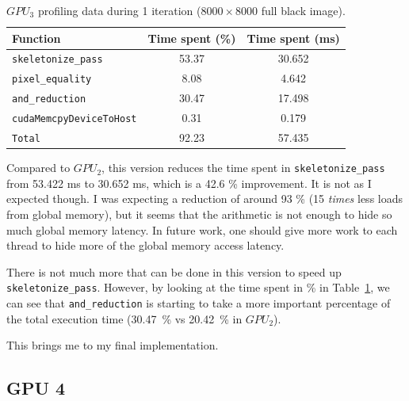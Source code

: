 \documentclass[11pt,a4paper]{article}
\begin{document}
                \begin{table}[ht]
                    \centering
                    \begin{tabular}{lcc}
                        \toprule
                        Function                      & Time spent (\%) & Time spent (ms) \\
                        \midrule
                        \verb+skeletonize_pass+       & 53.37           & 30.652          \\
                        \verb+pixel_equality+         & 8.08            & 4.642           \\
                        \verb+and_reduction+          & 30.47           & 17.498          \\
                        \verb+cudaMemcpyDeviceToHost+ & 0.31            & 0.179           \\
                        \midrule
                        \verb+Total+                  & 92.23           & 57.435          \\
                        \bottomrule
                    \end{tabular}
                    \caption{$GPU_{3}$ profiling data during 1 iteration ($8000 \times 8000$ full black image).}
                    \label{tab:black_gpu3_timing_diagram}
                \end{table}

                Compared to $GPU_{2}$, this version reduces the time spent in \verb+skeletonize_pass+ from 53.422 ms to 30.652 ms, which is a 42.6 \% improvement.
                It is not as I expected though. I was expecting a reduction of around 93 \% (15 \emph{times} less loads from global memory), but it seems that the arithmetic is not enough to hide so much global memory latency.
                In future work, one should give more work to each thread to hide more of the global memory access latency.

                There is not much more that can be done in this version to speed up \verb+skeletonize_pass+. However, by looking at the time spent in \% in Table~\ref{tab:black_gpu3_timing_diagram}, we can see that \verb+and_reduction+ is starting to take a more important percentage of the total execution time (30.47~\% vs 20.42~\% in $GPU_{2}$).

                This brings me to my final implementation.

        \subsection{GPU 4}
            \label{sec:solution_4}
\end{document}
